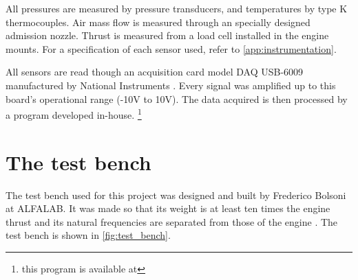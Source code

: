 \documentclass[tcc]{subfiles}
\begin{document}
All pressures are measured by pressure transducers, and temperatures by type K thermocouples. 
Air mass flow is measured through an specially designed admission nozzle. 
Thrust is measured from a load cell installed in the engine mounts.
For a specification of each sensor used, refer to \cref{app:instrumentation}.

All sensors are read though an acquisition card 
model DAQ USB-6009 manufactured by National Instruments 
\cite{acquisition card}.
Every signal was amplified up to this board's operational range (-10V to 10V). 
The data acquired is then processed by a program developed in-house.%
\footnote{this program is available at }

\section{The test bench}

The test bench used for this project was designed and built by Frederico Bolsoni at ALFALAB.
It was made so that its weight is at least ten times the engine thrust 
 and its natural frequencies are separated from those of the engine \cite{bolsoni}.
The test bench is shown in \cref{fig:test_bench}.
\end{document}
